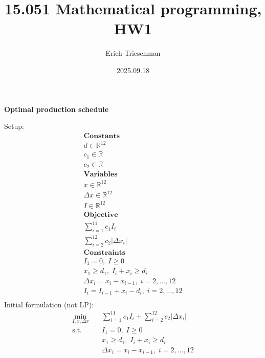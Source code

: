 \documentclass[12pt]{exam}
\title{15.051 Mathematical programming, HW1}
\author{Erich Trieschman}
\date{2025.09.18}
\begin{document}
\maketitle

\begin{questions}
    \question \textbf{Optimal production schedule}
    
    Setup: 
    \begin{align*}
        \textbf{Constants}\\
        d \in \mathbb{R}^{12} \tag{product units to deliver}\\
        c_1 \in \mathbb{R} \tag{monthly cost of storing product}\\
        c_2 \in \mathbb{R} \tag{monthly cost of production change}\\
        \textbf{Variables}\\
        x \in \mathbb{R}^{12}  \tag{monthly production}\\
        \Delta x \in \mathbb{R}^{12} \tag{change in monthly production}\\
        I \in \mathbb{R}^{12}\tag{monthly inventory}\\
        \textbf{Objective}\\
        \sum_{i=1}^{11} c_1 I_i \tag{inventory cost; none in final month}\\
        \sum_{i=2}^{12} c_2 |\Delta x_i| \tag{production change cost}\\
        \textbf{Constraints}\\
        I_1 = 0, \; I \geq 0 \tag{no starting inventory; never negative inventory}\\
        x_1 \geq d_1, \; I_i + x_i \geq d_i \tag{always meet demand}\\
        \Delta x_i = x_i - x_{i-1}, \; i=2, \dots, 12 \tag{define change in production}\\
        I_i = I_{i-1} + x_i - d_i, \; i=2, \dots, 12 \tag{define inventory}\\
    \end{align*}
    Initial formulation (not LP):
    \begin{align*}
      \min_{I, x, \Delta x} \quad & \sum_{i=1}^{11} c_1 I_i + \sum_{i=2}^{12} c_2 |\Delta x_i| \\
      \text{s.t.} \quad & I_1 = 0, \; I \geq 0\\
        & x_1 \geq d_1, \; I_i + x_i \geq d_i\\
        &\Delta x_i = x_i - x_{i-1}, \; i=2, \dots, 12\\

\end{align*}
\end{questions}
\end{document}
